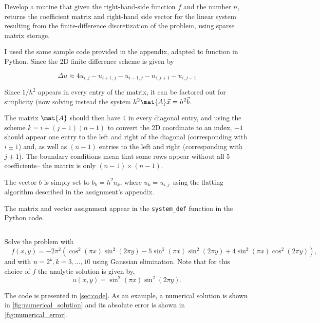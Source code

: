\documentclass{template}
\begin{document}
Develop a routine that given the right-hand-side function $f$ and 
the number $n$, returns the coefficient matrix and right-hand side vector 
for the linear system resulting from the finite-difference
discretization of the problem, using sparse matrix storage.

I used the same sample code provided in the appendix, adapted to function in Python. Since the 2D finite difference scheme is given by

\begin{equation}
    \Delta u \approx 4u_{i,j} - u_{i+1,j} - u_{i-1,j} - u_{i,j+1} - u_{i, j-1}
\end{equation}

Since $1/h^2$ appears in every entry of the matrix, it can be factored out for simplicity (now solving instead the system $h^2\mat{A}\vec{x} = h^2\vec{b}$.

The matrix $\mat{A}$ should then have $4$ in every diagonal entry, and using the scheme $k=i + (j-1)(n-1)$ to convert the 2D coordinate to an index, $-1$ should appear one entry to the left and right of the diagonal (corresponding with $i\pm1$) and, as well as $(n-1)$ entries to the left and right (corresponding with $j \pm 1$). The boundary conditions mean that some rows appear without all 5 coefficients-- the matrix is only $(n-1)\times(n-1)$.

The vector $b$ is simply set to $b_k = h^2u_k$, where $u_k = u_{i,j}$ using the flatting algorithm described in the assignment's appendix.

The matrix and vector assignment appear in the \verb|system_def| function in the Python code.


\subsection{}
Solve the problem with 
\begin{equation}\label{equ:rhs}
   \quad 
   f(x, y) = -2\pi^2(\cos^2(\pi x)\sin^2(2\pi y)-5\sin^2(\pi x)\sin^2(2\pi y)+4\sin^2(\pi x)\cos^2(2\pi y)),
\end{equation} 
and with $n = 2^k, k = 3, 
\ldots, 10$ using Gaussian elimination. Note that for this choice of $f$ the analytic solution is given by,
\[
   u(x, y) = \sin^2(\pi x) \sin^2(2\pi y).
\]


The code is presented in \autoref{sec:code}. As an example, a numerical solution is shown in \autoref{fig:numerical_solution} and its absolute error is shown in \autoref{fig:numerical_error}.
\end{document}
